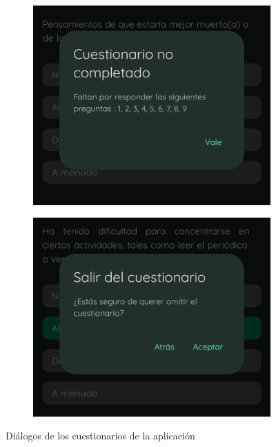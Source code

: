                 \begin{figure}[htbp]
                	\centering
                	\begin{subfigure}[c]{0.29\textwidth}
                		\centering
                		\includegraphics[width=1\textwidth]{figures/pantallas/Preguntas restantes.png}
                	\end{subfigure}
                	\hspace{0.05\textwidth}
                	\begin{subfigure}[c]{0.29\textwidth}
                		\centering
                		\includegraphics[width=1\linewidth]{figures/pantallas/Salir del cuestionario.png}
                	\end{subfigure}
                	\caption{Diálogos de los cuestionarios de la aplicación}
                	\label{figure:implementacion:pantalla:dialogos_cuestionarios}
                \end{figure}

